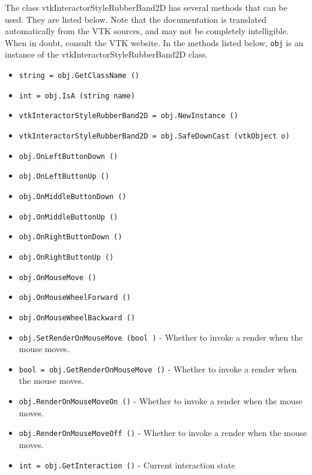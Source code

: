 The class vtkInteractorStyleRubberBand2D has several methods that can be used.
  They are listed below.
Note that the documentation is translated automatically from the VTK sources,
and may not be completely intelligible.  When in doubt, consult the VTK website.
In the methods listed below, \verb|obj| is an instance of the vtkInteractorStyleRubberBand2D class.
\begin{itemize}
\item  \verb|string = obj.GetClassName ()|

\item  \verb|int = obj.IsA (string name)|

\item  \verb|vtkInteractorStyleRubberBand2D = obj.NewInstance ()|

\item  \verb|vtkInteractorStyleRubberBand2D = obj.SafeDownCast (vtkObject o)|

\item  \verb|obj.OnLeftButtonDown ()|

\item  \verb|obj.OnLeftButtonUp ()|

\item  \verb|obj.OnMiddleButtonDown ()|

\item  \verb|obj.OnMiddleButtonUp ()|

\item  \verb|obj.OnRightButtonDown ()|

\item  \verb|obj.OnRightButtonUp ()|

\item  \verb|obj.OnMouseMove ()|

\item  \verb|obj.OnMouseWheelForward ()|

\item  \verb|obj.OnMouseWheelBackward ()|

\item  \verb|obj.SetRenderOnMouseMove (bool )| -  Whether to invoke a render when the mouse moves.

\item  \verb|bool = obj.GetRenderOnMouseMove ()| -  Whether to invoke a render when the mouse moves.

\item  \verb|obj.RenderOnMouseMoveOn ()| -  Whether to invoke a render when the mouse moves.

\item  \verb|obj.RenderOnMouseMoveOff ()| -  Whether to invoke a render when the mouse moves.

\item  \verb|int = obj.GetInteraction ()| -  Current interaction state

\end{itemize}

